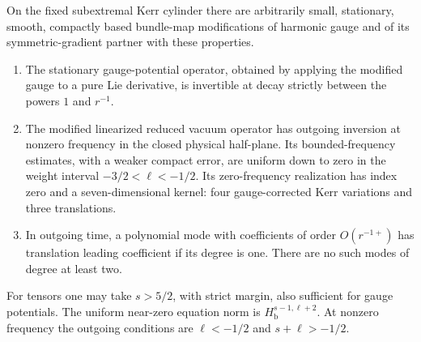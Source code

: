 \begin{proposition}\label{st:hhv}
On the fixed subextremal Kerr cylinder there are arbitrarily small,
stationary, smooth, compactly based bundle-map modifications of
harmonic gauge and of its symmetric-gradient partner with these
properties.
\begin{enumerate}
\item The stationary gauge-potential operator, obtained by applying
the modified gauge to a pure Lie derivative, is invertible at decay
strictly between the powers $1$ and $r^{-1}$.
\item The modified linearized reduced vacuum operator has outgoing
inversion at nonzero frequency in the closed physical half-plane.
Its bounded-frequency estimates, with a weaker compact error, are
uniform down to zero in the weight interval $-3/2<\ell<-1/2$.
Its zero-frequency realization has index zero and a seven-dimensional
kernel: four gauge-corrected Kerr variations and three translations.
\item In outgoing time, a polynomial mode with coefficients of
order $O(r^{-1+})$ has translation leading coefficient if its
degree is one.  There are no such modes of degree at least two.
\end{enumerate}
For tensors one may take $s>5/2$, with strict margin, also sufficient
for gauge potentials.  The uniform near-zero equation norm is
$H_{\mathrm b}^{s-1,\ell+2}$.  At nonzero frequency the outgoing
conditions are $\ell<-1/2$ and $s+\ell>-1/2$.
\end{proposition}

